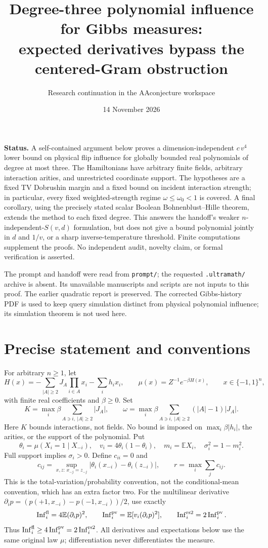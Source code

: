 \documentclass[11pt]{article}
\title{Degree-three polynomial influence for Gibbs measures:\\
expected derivatives bypass the centered-Gram obstruction}
\author{Research continuation in the AAconjecture workspace}
\date{14 November 2026}
\newcommand{\E}{\mathbb E}
\newcommand{\Inf}{\operatorname{Inf}}
\begin{document}
\maketitle

\noindent\textbf{Status.} A self-contained argument below proves a
dimension-independent $c\,v^4$ lower bound on physical flip influence
for globally bounded real polynomials of degree at most three. The
Hamiltonians have arbitrary finite fields, arbitrary interaction
arities, and unrestricted coordinate support. The hypotheses are a
fixed TV Dobrushin margin and a fixed bound on incident interaction
strength; in particular, every fixed weighted-strength regime
$\omega\le\omega_0<1$ is covered. A final corollary, using the precisely
stated scalar Boolean Bohnenblust--Hille theorem, extends the method
to each fixed degree. This answers the handoff's weaker
$n$-independent-$S(v,d)$ formulation, but does not give a bound
polynomial jointly in $d$ and $1/v$, or a sharp inverse-temperature
threshold. Finite computations supplement the proofs. No independent
audit, novelty claim, or formal verification is asserted.

The prompt and handoff were read from \texttt{prompt/}; the requested
\texttt{.ultramath/} archive is absent. Its unavailable manuscripts and
scripts are not inputs to this proof. The earlier quadratic report is
preserved. The corrected Gibbs-history PDF is used to keep query
simulation distinct from physical polynomial influence; its simulation
theorem is not used here.

\section{Precise statement and conventions}

For arbitrary $n\ge1$, let
\[
 H(x)=-\sum_{|A|\ge2}J_A\prod_{i\in A}x_i-\sum_i h_ix_i,
 \qquad \mu(x)=Z^{-1}e^{-\beta H(x)},\qquad x\in\{-1,1\}^n,
\]
with finite real coefficients and $\beta\ge0$. Set
\[
 K=\max_i\beta\sum_{A\ni i,\ |A|\ge2}|J_A|,
 \qquad \omega=\max_i\beta\sum_{A\ni i,\ |A|\ge2}(|A|-1)|J_A|.
\]
Here $K$ bounds interactions, not fields. No bound is imposed on
$\max_i\beta|h_i|$, the arities, or the support of the polynomial.
Put
\[
 \theta_i=\mu(X_i=1\mid X_{-i}),\quad
 v_i=4\theta_i(1-\theta_i),\quad
 m_i=\E X_i,\quad \sigma_i^2=1-m_i^2.
\]
Full support implies $\sigma_i>0$. Define $c_{ii}=0$ and
\[
 c_{ij}=\sup_{x,z:\,x_{-j}=z_{-j}}
 |\theta_i(x_{-i})-\theta_i(z_{-i})|,
 \qquad r=\max_i\sum_j c_{ij}.
\]
This is the total-variation/probability convention, not the
conditional-mean convention, which has an extra factor two.
For the multilinear derivative
$\partial_i p=(p(+1,x_{-i})-p(-1,x_{-i}))/2$, use exactly
\[
 \Inf_i^{\rm fl}=4\E(\partial_i p)^2,\qquad
 \Inf_i^{\rm pv}=\E[v_i(\partial_i p)^2],\qquad
 \Inf_i^{\rm rs2}=2\Inf_i^{\rm pv}.
\]
Thus $\Inf_i^{\rm fl}\ge4\Inf_i^{\rm pv}=2\Inf_i^{\rm rs2}$.
All derivatives and expectations below use the same original law
$\mu$; differentiation never differentiates the measure.
\end{document}
